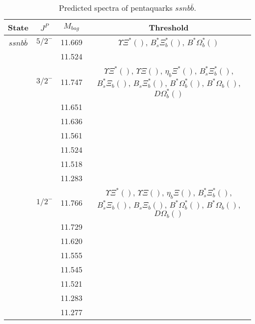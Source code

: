 \documentclass[prd,twocolumn,floatfix,nofootinbib]{revtex4}
\begin{document}
\renewcommand{\tabcolsep}{0.2cm}
\renewcommand{\arraystretch}{1.2}
\begin{table*}[!htbp]
    \caption{Predicted spectra of pentaquarks $ssnb\bar{b}$.}
    \begin{tabular}{cccc}
        \hline\hline
        {\rm State} &$J^{P}$ &$M_{bag}$ &Threshold \\ \hline
        $ssnb\bar{b}$
            &${5/2}^{-}$    &11.669 &$\Upsilon\Xi^{\ast}()$, $B_{s}^{\ast}\Xi_{b}^{\ast}()$, $B^{\ast}\Omega_{b}^{\ast}()$ \\
            &               &11.524 & \\
            &${3/2}^{-}$    &11.747 &$\Upsilon\Xi^{\ast}()$, $\Upsilon\Xi()$, $\eta_{b}\Xi^{\ast}()$, $B_{s}^{\ast}\Xi_{b}^{\ast}()$, $B_{s}^{\ast}\Xi_{b}()$, $B_{s}\Xi_{b}^{\ast}()$, $B^{\ast}\Omega_{b}^{\ast}()$, $B^{\ast}\Omega_{b}()$, $D\Omega_{b}^{\ast}()$ \\
            &               &11.651 & \\
            &               &11.636 & \\
            &               &11.561 & \\
            &               &11.524 & \\
            &               &11.518 & \\
            &               &11.283 & \\
            &${1/2}^{-}$    &11.766 &$\Upsilon\Xi^{\ast}()$, $\Upsilon\Xi()$, $\eta_{b}\Xi()$, $B_{s}^{\ast}\Xi_{b}^{\ast}()$, $B_{s}^{\ast}\Xi_{b}()$, $B_{s}\Xi_{b}()$, $B^{\ast}\Omega_{b}^{\ast}()$, $B^{\ast}\Omega_{b}()$, $D\Omega_{b}()$ \\
            &               &11.729 & \\
            &               &11.620 & \\
            &               &11.555 & \\
            &               &11.545 & \\
            &               &11.521 & \\
            &               &11.283 & \\
            &               &11.277 & \\
        \hline\hline
    \end{tabular}
\end{table*}
\end{document}
